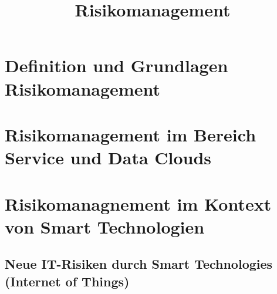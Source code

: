 \documentclass{report}
\begin{document}
\pagestyle{plain}

\title{Risikomanagement}


\maketitle

\tableofcontents
\newpage


\chapter{Definition und Grundlagen Risikomanagement}
\label{sect:grundlagen}






\chapter{Risikomanagement im Bereich Service und Data Clouds}
\label{sect:clouds}



\chapter{Risikomanagnement im Kontext von Smart Technologien}
\label{sect:relevance}

\section{Neue IT-Risiken durch Smart Technologies (Internet of Things)}
\end{document}
